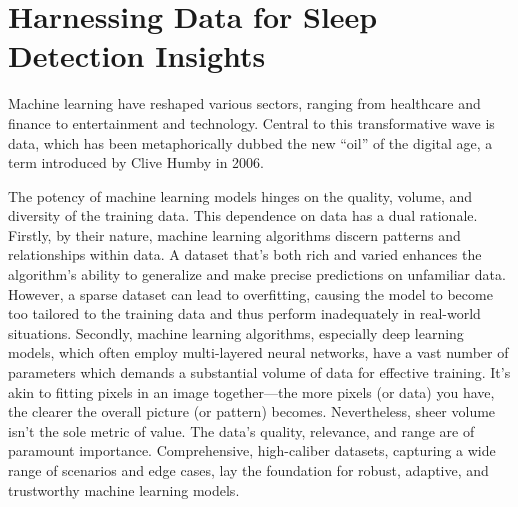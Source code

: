 \documentclass[
  10pt,
]{scrbook}
\begin{document}
\hypertarget{harnessing-data-for-sleep-detection-insights}{%
\section{Harnessing Data for Sleep Detection
Insights}\label{harnessing-data-for-sleep-detection-insights}}

Machine learning have reshaped various sectors, ranging from healthcare
and finance to entertainment and technology. Central to this
transformative wave is data, which has been metaphorically dubbed the
new ``oil'' of the digital age, a term introduced by Clive Humby in
2006.

The potency of machine learning models hinges on the quality, volume,
and diversity of the training data. This dependence on data has a dual
rationale. Firstly, by their nature, machine learning algorithms discern
patterns and relationships within data. A dataset that's both rich and
varied enhances the algorithm's ability to generalize and make precise
predictions on unfamiliar data. However, a sparse dataset can lead to
overfitting, causing the model to become too tailored to the training
data and thus perform inadequately in real-world situations. Secondly,
machine learning algorithms, especially deep learning models, which
often employ multi-layered neural networks, have a vast number of
parameters which demands a substantial volume of data for effective
training. It's akin to fitting pixels in an image together---the more
pixels (or data) you have, the clearer the overall picture (or pattern)
becomes. Nevertheless, sheer volume isn't the sole metric of value. The
data's quality, relevance, and range are of paramount importance.
Comprehensive, high-caliber datasets, capturing a wide range of
scenarios and edge cases, lay the foundation for robust, adaptive, and
trustworthy machine learning models.
\end{document}
